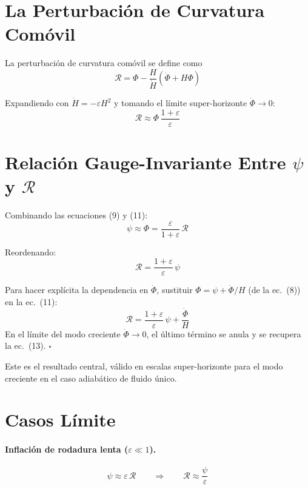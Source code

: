 \documentclass[12pt,a4paper]{article}
\begin{document}
\section{La Perturbación de Curvatura Comóvil}

La perturbación de curvatura comóvil se define como
\begin{equation}
\mathcal{R} = \Phi - \frac{H}{\dot{H}}\left(\dot{\Phi} + H\Phi\right) \tag{10}
\end{equation}

Expandiendo con $\dot{H} = -\varepsilon H^2$ y tomando el límite super-horizonte $\dot{\Phi} \to 0$:
\begin{equation}
\mathcal{R} \approx \Phi\,\frac{1 + \varepsilon}{\varepsilon} \tag{11}
\end{equation}

\section{Relación Gauge-Invariante Entre $\psi$ y $\mathcal{R}$}

Combinando las ecuaciones (9) y (11):
\begin{equation}
\psi \approx \Phi = \frac{\varepsilon}{1+\varepsilon}\,\mathcal{R} \tag{12}
\end{equation}

Reordenando:
\begin{equation}
\mathcal{R} = \frac{1 + \varepsilon}{\varepsilon}\,\psi \tag{13}
\end{equation}

Para hacer explícita la dependencia en $\dot{\Phi}$, sustituir $\Phi = \psi + \dot{\Phi}/H$ (de la ec.~(8)) en la ec.~(11):
\begin{equation}
\mathcal{R} = \frac{1+\varepsilon}{\varepsilon}\,\psi + \frac{\dot\Phi}{H} \tag{14}
\end{equation}
En el límite del modo creciente $\dot{\Phi} \to 0$, el último término se anula y se recupera la ec.~(13). $\square$

Este es el resultado central, válido en escalas super-horizonte para el modo creciente en el caso adiabático de fluido único.

\section{Casos Límite}

\paragraph{Inflación de rodadura lenta ($\varepsilon \ll 1$).}
\begin{equation}
\psi \approx \varepsilon\,\mathcal{R} \qquad \Longrightarrow \qquad \mathcal{R} \approx \frac{\psi}{\varepsilon} \tag{15}
\end{equation}
\end{document}
